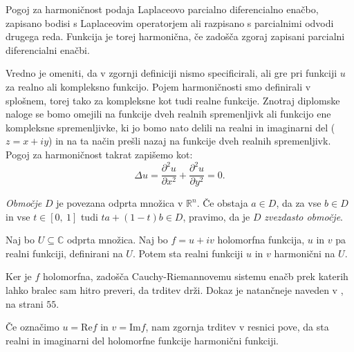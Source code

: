 \documentclass[mat1]{fmfdelo}
\begin{document}
    Pogoj za harmoničnost podaja Laplaceovo parcialno diferencialno enačbo, zapisano bodisi s Laplaceovim operatorjem ali razpisano s parcialnimi odvodi drugega reda. 
    Funkcija je torej harmonična, če zadošča zgoraj zapisani parcialni diferencialni enačbi. 

    \begin{opomba}
        Vredno je omeniti, da v zgornji definiciji nismo specificirali, ali gre pri funkciji $u$ za realno ali kompleksno funkcijo. 
        Pojem harmoničnosti smo definirali v splošnem, torej tako za kompleksne kot tudi realne funkcije.
        Znotraj diplomske naloge se bomo omejili na funkcije dveh realnih spremenljivk ali funkcijo ene kompleksne spremenljivke, ki jo bomo nato delili na realni in imaginarni del ($z = x + iy $) in na ta način prešli nazaj na funkcije dveh realnih spremenljivk.
        \newline
        Pogoj za harmoničnost takrat zapišemo kot: 
            $$
                \Delta u = \frac{\partial^2 u}{\partial x ^ 2} +  \frac{\partial^2 u}{\partial y ^ 2}= 0.
            $$
    \end{opomba}

    \begin{definicija}
        \emph{Območje} $D$ je povezana odprta množica v $\mathbb{R}^n$.
        Če obstaja $a \in D$, da za vse $b \in D$ in vse $t \in [0,~1]$ tudi $t a + (1-t)b \in D$, pravimo, da je $D$ \emph{zvezdasto območje}.
    \end{definicija}


    \begin{trditev}
        \label{hh}
        Naj bo $U \subseteq \mathbb{C}$ odprta množica. Naj bo $f = u + iv$ holomorfna funkcija, $u$ in $v$ pa realni funkciji, definirani na $U$. Potem sta realni funkciji $u$ in $v$ harmonični na $U$.
    \end{trditev}

    \begin{dokaz}
        Ker je $f$ holomorfna, zadošča Cauchy-Riemannovemu sistemu enačb prek katerih lahko bralec sam hitro preveri, da trditev drži. Dokaz je natančneje naveden v \cite{osnova}, na strani $55$.
    \end{dokaz}

    \begin{opomba}
        Če označimo $u = \text{Re}{f}$ in $v = \text{Im}{f}$, nam zgornja trditev v resnici pove, da sta realni in imaginarni del holomorfne funkcije harmonični funkciji. 
    \end{opomba}
\end{document}
